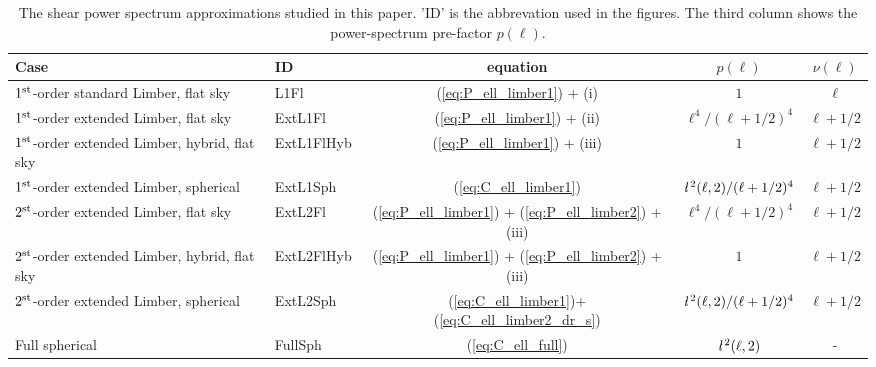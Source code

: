 \documentclass[fleqn,usenatbib]{mnras} %
\newcommand{\ellbar}{\hbox{\it \l}\,}
\begin{document}

\renewcommand{\baselinestretch}{1.5}
\begin{table}
\begin{centering}
  \caption{\label{tab:cases}The shear power spectrum approximations studied in this paper. 'ID' is the abbrevation used in the figures.
    The third column shows the power-spectrum pre-factor $p(\ell)$. }  
    \begin{tabular}{|l|l|c|c|c}
  \hline
  Case & ID & equation & $p(\ell)$ & $\nu(\ell)$ \\ \hline
  $1^{\rm st}$-order standard Limber, flat sky & L1Fl & (\ref{eq:P_ell_limber1}) + (i)
    & $1$ & $\ell$ \\ \hline
  $1^{\rm st}$-order extended Limber, flat sky & ExtL1Fl & (\ref{eq:P_ell_limber1}) + (ii)
    & $\ell^4/(\ell+1/2)^4$ & $\ell + 1/2$ \\ \hline
  $1^{\rm st}$-order extended Limber, hybrid, flat sky & ExtL1FlHyb & (\ref{eq:P_ell_limber1}) + (iii)
    & $1$ & $\ell + 1/2$ \\ \hline
  $1^{\rm st}$-order extended Limber, spherical & ExtL1Sph & (\ref{eq:C_ell_limber1})
    & $\ellbar^2(\ell, 2)/(\ell+1/2)^4$ & $\ell+1/2$ \\ \hline
  $2^{\rm st}$-order extended Limber, flat sky & ExtL2Fl &  (\ref{eq:P_ell_limber1}) + (\ref{eq:P_ell_limber2}) + (iii)
    & $\ell^4/(\ell+1/2)^4$ 
    & $\ell+1/2$ \\ \hline
  $2^{\rm st}$-order extended Limber, hybrid, flat sky & ExtL2FlHyb &  (\ref{eq:P_ell_limber1}) + (\ref{eq:P_ell_limber2}) + (iii)
    & $1$ 
    & $\ell+1/2$ \\ \hline
  $2^{\rm st}$-order extended Limber, spherical & ExtL2Sph & (\ref{eq:C_ell_limber1})+(\ref{eq:C_ell_limber2_dr_s})
    & $\ellbar^2(\ell, 2)/(\ell+1/2)^4$ & $\ell+1/2$ \\ \hline
  Full spherical & FullSph & (\ref{eq:C_ell_full}) &
      $\ellbar^2(\ell, 2)$ & - \\ \hline
  \end{tabular}

\end{centering}
\end{table}
\renewcommand{\baselinestretch}{1}
\end{document}
